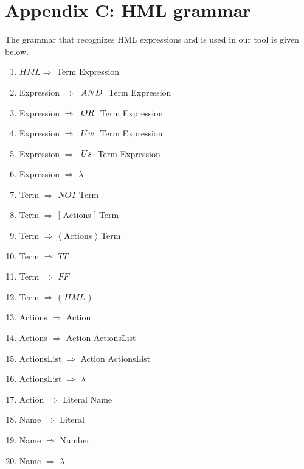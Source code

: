 \section*{Appendix C: HML grammar}
\label{appendixC}

The grammar that recognizes HML expressions and is used in our tool is given below.

\begin{enumerate}
\item $HML \Rightarrow$ Term Expression
\item Expression $\Rightarrow$ $\hspace{1 mm} AND \hspace{1 mm} $ Term Expression
\item Expression $\Rightarrow$ $\hspace{1 mm} OR \hspace{1 mm} $ Term Expression
\item Expression $\Rightarrow$ $\hspace{1 mm} Uw \hspace{1 mm} $ Term Expression
\item Expression $\Rightarrow$ $\hspace{1 mm} Us \hspace{1 mm} $ Term Expression
\item Expression $\Rightarrow$ $\lambda$
\item Term $\Rightarrow$ $NOT$ Term
\item Term $\Rightarrow$ [ Actions ] Term
\item Term $\Rightarrow$ $\langle$ Actions $\rangle$ Term
\item Term $\Rightarrow$ $TT$
\item Term $\Rightarrow$ $FF$
\item Term $\Rightarrow$ ( $HML$ )
\item Actions $\Rightarrow$ Action
\item Actions $\Rightarrow$ { Action ActionsList }
\item ActionsList $\Rightarrow$ Action ActionsList
\item ActionsList $\Rightarrow$ $\lambda$
\item Action $\Rightarrow$ Literal Name
\item Name $\Rightarrow$ Literal
\item Name $\Rightarrow$ Number
\item Name $\Rightarrow$ $\lambda$

\end{enumerate}

